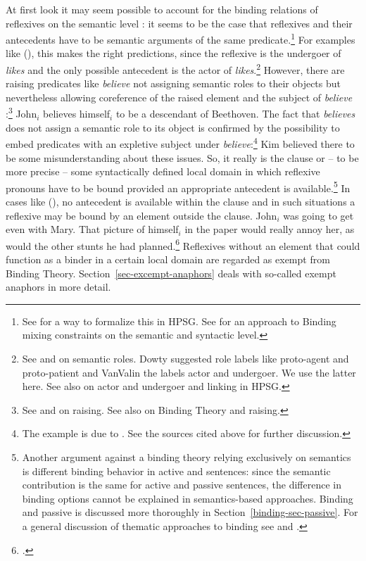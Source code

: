 \documentclass[output=paper
 	        ,biblatex
                ,babelshorthands
                ,newtxmath
                ,draftmode
                ,colorlinks, citecolor=brown
]{langscibook}
\begin{document}
At first look it may seem possible to account for the binding relations of reflexives on the
semantic level \citep{BP80a}: it seems to be the case that reflexives and their antecedents have to be semantic
arguments of the same predicate.\footnote{%
  See \citet{Riezler95a} for a way to formalize this in HPSG. See  for an approach to
  Binding mixing constraints on the semantic and syntactic level.%
} For examples like (), this makes the right predictions,
since the reflexive is the undergoer of \emph{likes} and the only possible antecedent is the actor of
\emph{likes}.\footnote{
  See  and  on semantic roles. Dowty suggested role labels like
  proto-agent and proto-patient and VanValin the labels actor and undergoer. We use the latter
  here. See also  on
  actor and undergoer and linking in HPSG.
} However, there are raising predicates like \emph{believe} not assigning semantic roles
to their objects but nevertheless allowing coreference of the raised element and the subject of
\emph{believe} \citep[]{MS98a}:\footnote{%
 See  and  on raising. See also  on Binding
 Theory and raising.%
}
\ea
John$_i$ believes himself$_i$ to be a descendant of Beethoven.
\z
The fact that \emph{believes} does not assign a semantic role to its object is confirmed by the
possibility to embed predicates with an expletive subject under \emph{believe}:\footnote{%
The example is due to \citet[]{ps2}. See the sources cited above for further discussion.
}
\ea
Kim believed there to be some misunderstanding about these issues.
\z
So, it really is the clause or -- to be more precise -- some syntactically defined local domain in
which reflexive pronouns have to be bound provided an appropriate antecedent is available.\footnote{%
Another argument against a binding theory relying exclusively on semantics is different binding
behavior in active and  sentences: since the semantic contribution is the same for active
and passive sentences, the difference in binding options cannot be explained in semantics-based
approaches. Binding and passive is discussed more thoroughly in Section~\ref{binding-sec-passive}. 
For a general discussion of
thematic approaches to binding see  and .
}
In cases like (), no antecedent is available within the clause and in such situations a
reflexive may be bound by an element outside the clause.
\ea
John$_i$ was going to get even with Mary. That picture of himself$_i$
in the paper would really annoy her, as would the other stunts he had planned.\footnote{
        .
}
\z
Reflexives without an element that could function as a binder in a certain local domain are regarded
as exempt from Binding Theory. Section~\ref{sec-excempt-anaphors} deals with so-called exempt anaphors in more detail.
\end{document}
